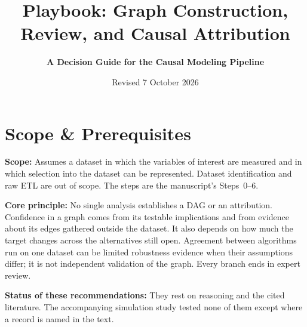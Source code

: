 \documentclass[10pt,a4paper]{article}
\title{\Large\textbf{Playbook: Graph Construction, Review, and Causal Attribution}}
\author{\small\textbf{A Decision Guide for the Causal Modeling Pipeline}}
\date{\small Revised 7 October 2026}
\begin{document}
\maketitle
\vspace{-0.6cm}

\section*{Scope \& Prerequisites}
\small \textbf{Scope:} Assumes a dataset in which the variables of interest are measured and in which selection into the dataset can be represented. Dataset identification and raw ETL are out of scope. The steps are the manuscript's Steps~0--6.

\noindent\textbf{Core principle:} No single analysis establishes a DAG or an attribution. Confidence in a graph comes from its testable implications and from evidence about its edges gathered outside the dataset. It also depends on how much the target changes across the alternatives still open. Agreement between algorithms run on one dataset can be limited robustness evidence when their assumptions differ; it is not independent validation of the graph. Every branch ends in expert review.

\noindent\textbf{Status of these recommendations:} They rest on reasoning and the cited literature. The accompanying simulation study tested none of them except where a record is named in the text.
\end{document}
